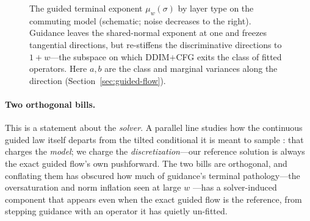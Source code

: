 \documentclass{article} %
\theoremstyle{plain}
\theoremstyle{definition}
\theoremstyle{remark}
\begin{document}
\begin{figure}[t]
\centering
{}
\caption{The guided terminal exponent $\mu_w(\sigma)$ by layer type on the
commuting model (schematic; noise decreases to the right). Guidance leaves the
shared-normal exponent at one and freezes tangential directions, but
re-stiffens the discriminative directions to $1+w$---the subspace on which
DDIM$+$CFG exits the class of fitted operators.  Here $a,b$ are the class and
marginal variances along the direction (Section~\ref{sec:guided-flow}).}
\label{fig:layers}
\end{figure}

\paragraph{Two orthogonal bills.}
This is a statement about the \emph{solver}. A parallel line studies how the
continuous guided law itself departs from the tilted conditional it is meant
to sample \citep{bradley2024cfg,chidambaram2024cfg}: that charges the
\emph{model}; we charge the \emph{discretization}---our reference solution is
always the exact guided flow's own pushforward. The two bills are orthogonal,
and conflating them has obscured how much of guidance's terminal
pathology---the oversaturation and norm inflation seen at large $w$
\citep{sadat2025apg}---has a solver-induced component that appears even when
the exact guided flow is the reference, from stepping guidance with an
operator it has quietly un-fitted.
\end{document}
